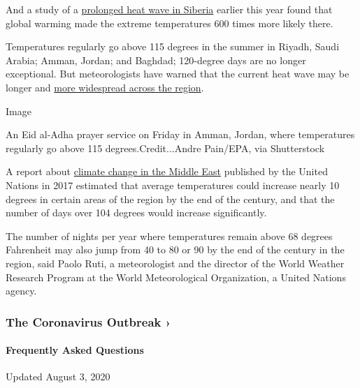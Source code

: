 And a study of a
\href{https://www.nytimes3xbfgragh.onion/2020/07/15/climate/siberia-heat-wave-climate-change.html}{prolonged
heat wave in Siberia} earlier this year found that global warming made
the extreme temperatures 600 times more likely there.

Temperatures regularly go above 115 degrees in the summer in Riyadh,
Saudi Arabia; Amman, Jordan; and Baghdad; 120-degree days are no longer
exceptional. But meteorologists have warned that the current heat wave
may be longer and
\href{https://public.wmo.int/en/media/news/above-normal-temperatures-likely-over-arab-region}{more
widespread across the region}.

Image

An Eid al-Adha prayer service on Friday in Amman, Jordan, where
temperatures regularly go above 115 degrees.Credit...Andre Pain/EPA, via
Shutterstock

A report about
\href{https://www.unescwa.org/sites/www.unescwa.org/files/events/files/riccar_main_report_2017.pdf}{climate
change in the Middle East} published by the United Nations in 2017
estimated that average temperatures could increase nearly 10 degrees in
certain areas of the region by the end of the century, and that the
number of days over 104 degrees would increase significantly.

The number of nights per year where temperatures remain above 68 degrees
Fahrenheit may also jump from 40 to 80 or 90 by the end of the century
in the region, said Paolo Ruti, a meteorologist and the director of the
World Weather Research Program at the World Meteorological Organization,
a United Nations agency.

\href{https://www.nytimes3xbfgragh.onion/news-event/coronavirus?action=click\&pgtype=Article\&state=default\&region=MAIN_CONTENT_3\&context=storylines_faq}{}

\hypertarget{the-coronavirus-outbreak-}{%
\subsubsection{The Coronavirus Outbreak
›}\label{the-coronavirus-outbreak-}}

\hypertarget{frequently-asked-questions}{%
\paragraph{Frequently Asked
Questions}\label{frequently-asked-questions}}

Updated August 3, 2020

